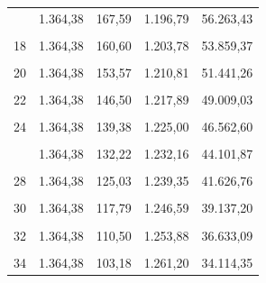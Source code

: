 \begin{longtable}[t]{rrrrr}
\addlinespace
16 & 1.364,38 & 167,59 & 1.196,79 & 56.263,43\\
\cellcolor{gray!10}{17} & \cellcolor{gray!10}{1.364,38} & \cellcolor{gray!10}{164,10} & \cellcolor{gray!10}{1.200,28} & \cellcolor{gray!10}{55.063,15}\\
18 & 1.364,38 & 160,60 & 1.203,78 & 53.859,37\\
\cellcolor{gray!10}{19} & \cellcolor{gray!10}{1.364,38} & \cellcolor{gray!10}{157,09} & \cellcolor{gray!10}{1.207,29} & \cellcolor{gray!10}{52.652,08}\\
20 & 1.364,38 & 153,57 & 1.210,81 & 51.441,26\\
\addlinespace
\cellcolor{gray!10}{21} & \cellcolor{gray!10}{1.364,38} & \cellcolor{gray!10}{150,04} & \cellcolor{gray!10}{1.214,34} & \cellcolor{gray!10}{50.226,92}\\
22 & 1.364,38 & 146,50 & 1.217,89 & 49.009,03\\
\cellcolor{gray!10}{23} & \cellcolor{gray!10}{1.364,38} & \cellcolor{gray!10}{142,94} & \cellcolor{gray!10}{1.221,44} & \cellcolor{gray!10}{47.787,60}\\
24 & 1.364,38 & 139,38 & 1.225,00 & 46.562,60\\
\cellcolor{gray!10}{25} & \cellcolor{gray!10}{1.364,38} & \cellcolor{gray!10}{135,81} & \cellcolor{gray!10}{1.228,57} & \cellcolor{gray!10}{45.334,02}\\
\addlinespace
26 & 1.364,38 & 132,22 & 1.232,16 & 44.101,87\\
\cellcolor{gray!10}{27} & \cellcolor{gray!10}{1.364,38} & \cellcolor{gray!10}{128,63} & \cellcolor{gray!10}{1.235,75} & \cellcolor{gray!10}{42.866,11}\\
28 & 1.364,38 & 125,03 & 1.239,35 & 41.626,76\\
\cellcolor{gray!10}{29} & \cellcolor{gray!10}{1.364,38} & \cellcolor{gray!10}{121,41} & \cellcolor{gray!10}{1.242,97} & \cellcolor{gray!10}{40.383,79}\\
30 & 1.364,38 & 117,79 & 1.246,59 & 39.137,20\\
\addlinespace
\cellcolor{gray!10}{31} & \cellcolor{gray!10}{1.364,38} & \cellcolor{gray!10}{114,15} & \cellcolor{gray!10}{1.250,23} & \cellcolor{gray!10}{37.886,96}\\
32 & 1.364,38 & 110,50 & 1.253,88 & 36.633,09\\
\cellcolor{gray!10}{33} & \cellcolor{gray!10}{1.364,38} & \cellcolor{gray!10}{106,85} & \cellcolor{gray!10}{1.257,53} & \cellcolor{gray!10}{35.375,55}\\
34 & 1.364,38 & 103,18 & 1.261,20 & 34.114,35\\

\end{longtable}
